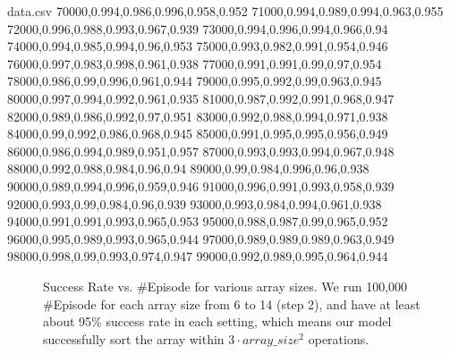\documentclass[pdflatex,sn-mathphys-num]{sn-jnl}%
\theoremstyle{thmstyleone}%
\theoremstyle{thmstyletwo}%
\theoremstyle{thmstylethree}%
\begin{document}
\begin{filecontents*}{data.csv}
70000,0.994,0.986,0.996,0.958,0.952
71000,0.994,0.989,0.994,0.963,0.955
72000,0.996,0.988,0.993,0.967,0.939
73000,0.994,0.996,0.994,0.966,0.94
74000,0.994,0.985,0.994,0.96,0.953
75000,0.993,0.982,0.991,0.954,0.946
76000,0.997,0.983,0.998,0.961,0.938
77000,0.991,0.991,0.99,0.97,0.954
78000,0.986,0.99,0.996,0.961,0.944
79000,0.995,0.992,0.99,0.963,0.945
80000,0.997,0.994,0.992,0.961,0.935
81000,0.987,0.992,0.991,0.968,0.947
82000,0.989,0.986,0.992,0.97,0.951
83000,0.992,0.988,0.994,0.971,0.938
84000,0.99,0.992,0.986,0.968,0.945
85000,0.991,0.995,0.995,0.956,0.949
86000,0.986,0.994,0.989,0.951,0.957
87000,0.993,0.993,0.994,0.967,0.948
88000,0.992,0.988,0.984,0.96,0.94
89000,0.99,0.984,0.996,0.96,0.938
90000,0.989,0.994,0.996,0.959,0.946
91000,0.996,0.991,0.993,0.958,0.939
92000,0.993,0.99,0.984,0.96,0.939
93000,0.993,0.984,0.994,0.961,0.938
94000,0.991,0.991,0.993,0.965,0.953
95000,0.988,0.987,0.99,0.965,0.952
96000,0.995,0.989,0.993,0.965,0.944
97000,0.989,0.989,0.989,0.963,0.949
98000,0.998,0.99,0.993,0.974,0.947
99000,0.992,0.989,0.995,0.964,0.944
\end{filecontents*}

\begin{figure}[htbp]
  \centering
  \caption{Success Rate vs. \#Episode for various array sizes. We run 100,000 \#Episode for each array size from 6 to 14 (step 2), and have at least about 95\% success rate in each setting, which means our model successfully sort the array within $3 \cdot array\_size^2 $ operations.}
  \label{fig:success_rate}
\end{figure}
\end{document}
